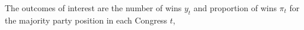 %
%
%
%
%
%
%
%



\noindent The outcomes of interest are the number of wins $y_t$ and proportion of wins 
$\pi_t$ for the majority party position in each Congress $t$,

